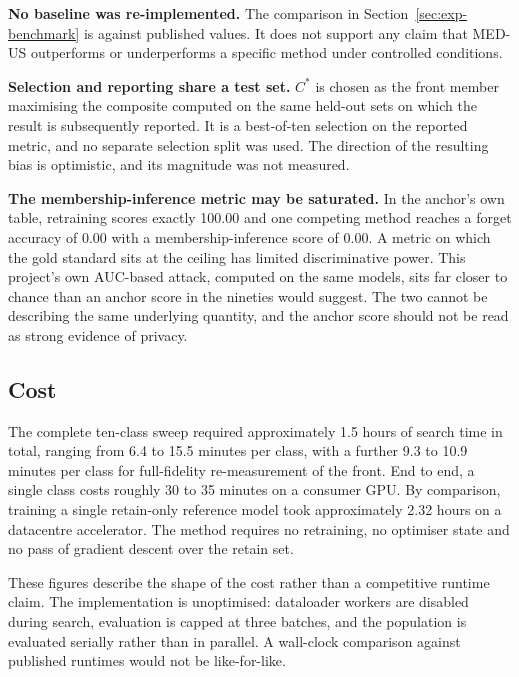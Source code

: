 \textbf{No baseline was re-implemented.} The comparison in
Section~\ref{sec:exp-benchmark} is against published values. It does not support
any claim that MED-US outperforms or underperforms a specific method under
controlled conditions.

\textbf{Selection and reporting share a test set.} $C^{*}$ is chosen as the front
member maximising the composite computed on the same held-out sets on which the
result is subsequently reported. It is a best-of-ten selection on the reported
metric, and no separate selection split was used. The direction of the resulting
bias is optimistic, and its magnitude was not measured.

\textbf{The membership-inference metric may be saturated.} In the anchor's own
table, retraining scores exactly 100.00 and one competing method reaches a forget
accuracy of 0.00 with a membership-inference score of 0.00. A metric on which the
gold standard sits at the ceiling has limited discriminative power. This project's
own AUC-based attack, computed on the same models, sits far closer to chance than
an anchor score in the nineties would suggest. The two cannot be describing the
same underlying quantity, and the anchor score should not be read as strong
evidence of privacy.

\subsection{Cost}

The complete ten-class sweep required approximately 1.5 hours of search time in
total, ranging from 6.4 to 15.5 minutes per class, with a further 9.3 to 10.9
minutes per class for full-fidelity re-measurement of the front. End to end, a
single class costs roughly 30 to 35 minutes on a consumer GPU. By comparison,
training a single retain-only reference model took approximately 2.32 hours on a
datacentre accelerator. The method requires no retraining, no optimiser state and
no pass of gradient descent over the retain set.

These figures describe the shape of the cost rather than a competitive runtime
claim. The implementation is unoptimised: dataloader workers are disabled during
search, evaluation is capped at three batches, and the population is evaluated
serially rather than in parallel. A wall-clock comparison against published
runtimes would not be like-for-like.
